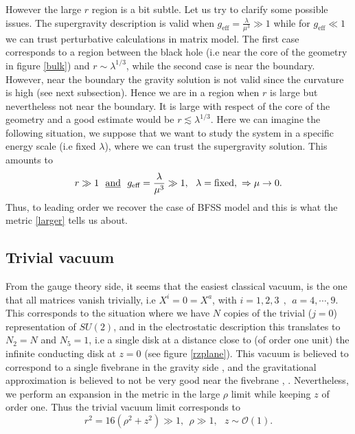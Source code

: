 \documentclass[11pt,english]{article}
\newcommand{\be}{\begin{equation}}
\newcommand{\ee}{\end{equation}}
\numberwithin{equation}{section}
\begin{document}
However the large $r$ region is a bit subtle. Let us try to clarify some possible issues. The supergravity description is valid when $g_{\text{eff}}=\frac{\lambda}{\mu^3}\gg 1$ while for $g_{\text{eff}}\ll 1$ we can trust perturbative calculations in matrix model. The first case corresponds to a region between the black hole (i.e near the core of the geometry in figure \ref{bulk}) and  $r\sim\lambda^{1/3}$, while the second case is near the boundary. However, near the boundary the gravity solution is not valid since the curvature is high (see next subsection).   Hence we are in a region when $r$ is large but nevertheless not near the boundary. It is large with respect of the core of the geometry and a good estimate would be $r\lesssim \lambda^{1/3}$. Here we can imagine the following situation, we suppose that we want to study the system in a specific energy scale (i.e fixed $\lambda$), where we can trust the supergravity solution. This amounts to 
\be 
r\gg 1~~\text{\underline{and}}~~g_{\text{eff}}=\frac{\lambda}{\mu^3}\gg1,~~\lambda=\text{fixed},~\Rightarrow \mu\to 0.
\ee 
Thus, to leading order we recover the case of BFSS model and this is what the metric \eqref{larger} tells us about.

 
\subsection{Trivial vacuum}
From the gauge theory side, it seems that the easiest classical vacuum, is the one that all matrices vanish trivially, i.e $X^i=0=X^a$, with $ i=1,2,3~~,~~a=4,\cdots,9$. This corresponds to the situation where we have  $N$ copies of the trivial ($j=0$) representation of $SU(2)$, and in the electrostatic description this translates to $N_2=N$ and $N_5=1$, i.e a single disk at a distance close to (of order one unit) the infinite conducting disk at $z=0$ (see figure \ref{rzplane}).  This vacuum is believed to correspond to a single fivebrane in the gravity side \cite{Maldacena2003}, and the gravitational approximation is believed to not be very good near the fivebrane  \cite{Berenstein2002}, \cite{Lin2006}. Nevertheless, we perform an expansion in the metric in the large $\rho$ limit while keeping $z$ of order one. Thus the trivial vacuum limit corresponds to 
\be 
r^2=16\left(\rho^2+z^2\right)\gg1,~~\rho\gg1,~~~z\sim\mathcal{O}(1).
\ee 
\end{document}
